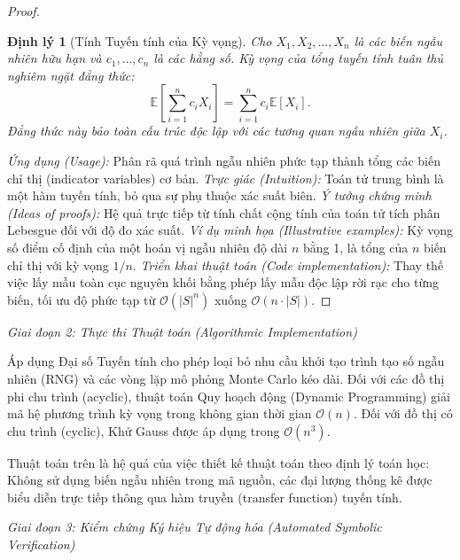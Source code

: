 \documentclass{article}
\newtheorem{dinhly}{Định lý}
\begin{document}
\begin{proof}
\begin{dinhly}[Tính Tuyến tính của Kỳ vọng]
Cho $X_1, X_2, \dots, X_n$ là các biến ngẫu nhiên hữu hạn và $c_1, \dots, c_n$ là các hằng số. Kỳ vọng của tổng tuyến tính tuân thủ nghiêm ngặt đẳng thức:
$$ \mathbb{E}\left[\sum_{i=1}^n c_i X_i\right] = \sum_{i=1}^n c_i \mathbb{E}[X_i]. $$
Đẳng thức này bảo toàn cấu trúc độc lập với các tương quan ngẫu nhiên giữa $X_i$.
\end{dinhly}
\emph{Ứng dụng (Usage):} Phân rã quá trình ngẫu nhiên phức tạp thành tổng các biến chỉ thị (indicator variables) cơ bản.
\emph{Trực giác (Intuition):} Toán tử trung bình là một hàm tuyến tính, bỏ qua sự phụ thuộc xác suất biên.
\emph{Ý tưởng chứng minh (Ideas of proofs):} Hệ quả trực tiếp từ tính chất cộng tính của toán tử tích phân Lebesgue đối với độ đo xác suất.
\emph{Ví dụ minh họa (Illustrative examples):} Kỳ vọng số điểm cố định của một hoán vị ngẫu nhiên độ dài $n$ bằng 1, là tổng của $n$ biến chỉ thị với kỳ vọng $1/n$.
\emph{Triển khai thuật toán (Code implementation):} Thay thế việc lấy mẫu toàn cục nguyên khối bằng phép lấy mẫu độc lập rời rạc cho từng biến, tối ưu độ phức tạp từ $\mathcal{O}(|S|^n)$ xuống $\mathcal{O}(n \cdot |S|)$.
\end{proof}

\vspace{0.5em}\noindent\emph{Giai đoạn 2: Thực thi Thuật toán (Algorithmic Implementation)}

Áp dụng Đại số Tuyến tính cho phép loại bỏ nhu cầu khởi tạo trình tạo số ngẫu nhiên (RNG) và các vòng lặp mô phỏng Monte Carlo kéo dài. Đối với các đồ thị phi chu trình (acyclic), thuật toán Quy hoạch động (Dynamic Programming) giải mã hệ phương trình kỳ vọng trong không gian thời gian $\mathcal{O}(n)$. Đối với đồ thị có chu trình (cyclic), Khử Gauss được áp dụng trong $\mathcal{O}(n^3)$.

Thuật toán trên là hệ quả của việc thiết kế thuật toán theo định lý toán học: Không sử dụng biến ngẫu nhiên trong mã nguồn, các đại lượng thống kê được biểu diễn trực tiếp thông qua hàm truyền (transfer function) tuyến tính.

\vspace{0.5em}\noindent\emph{Giai đoạn 3: Kiểm chứng Ký hiệu Tự động hóa (Automated Symbolic Verification)}
\end{document}
